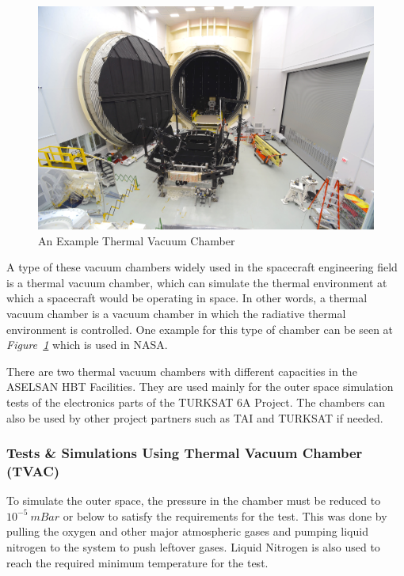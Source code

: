 \begin{figure}[h!]
	\center
	\setlength{\unitlength}{\textwidth} 
	\includegraphics[width=1.0\unitlength]{tvac}
	\caption{\label{fig:tvac}An Example Thermal Vacuum Chamber \cite{tvac}}
\end{figure}

	A type of these vacuum chambers widely used in the spacecraft engineering field is a thermal vacuum chamber, which can simulate the thermal environment at which a spacecraft would be operating in space. In other words,	a thermal vacuum chamber is a vacuum chamber in which the radiative thermal environment is controlled. One example for this type of chamber can be seen at \textit{Figure~\ref{fig:tvac}} which is used in NASA.


	There are two thermal vacuum chambers with different capacities in the ASELSAN HBT Facilities. They are used mainly for the outer space simulation tests of the electronics parts of the TURKSAT 6A Project. The chambers can also be used by other project partners such as TAI and TURKSAT if needed.
	
\subsubsection{Tests \& Simulations Using Thermal Vacuum Chamber (TVAC) }
\- \indent
	To simulate the outer space, the pressure in the chamber must be reduced to $10^{-5}~mBar$ or below to satisfy the requirements for the test. This was done by pulling the oxygen and other major atmospheric gases and pumping liquid nitrogen to the system to push leftover gases. Liquid Nitrogen is also used to reach the required minimum temperature for the test.
	
